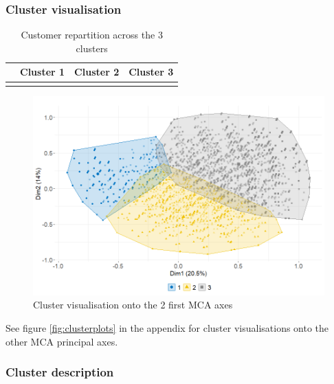\documentclass[
]{book}
\begin{document}
\hypertarget{cluster-visualisation}{%
\subsubsection*{Cluster visualisation}\label{cluster-visualisation}}

\begin{table}[H]

\caption{\label{tab:unnamed-chunk-27}Customer repartition across the 3 clusters}
\centering
\begin{tabular}[t]{lrrr}
\toprule
  & Cluster 1 & Cluster 2 & Cluster 3\\
\midrule
\cellcolor{gray!6}{\%} & \cellcolor{gray!6}{26.55} & \cellcolor{gray!6}{41.38} & \cellcolor{gray!6}{32.07}\\
\bottomrule
\end{tabular}
\end{table}

\begin{figure}

{\centering \includegraphics[width=12.83in]{./imgs/cluster_plot} 

}

\caption{Cluster visualisation onto the 2 first MCA axes}\label{fig:clusterplot}
\end{figure}

See figure \ref{fig:clusterplots} in the appendix for cluster visualisations onto the other MCA principal axes.

\hypertarget{cluster-description}{%
\subsubsection*{Cluster description}\label{cluster-description}}
\end{document}
